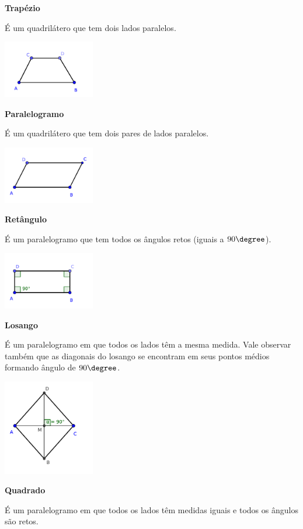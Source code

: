 \textbf{Trapézio}

É um quadrilátero que tem dois lados paralelos.

\includegraphics[width=4cm]{./cap_geometria/figs/trapezio}


\textbf{Paralelogramo}

É um quadrilátero que tem dois pares de lados paralelos.

\includegraphics[width=4cm]{./cap_geometria/figs/paralelogramo}


\textbf{Retângulo}

É um paralelogramo que tem todos os ângulos retos (iguais a $90\degree$).

\includegraphics[width=4cm]{./cap_geometria/figs/retangulo}


\textbf{Losango}

É um paralelogramo em que todos os lados têm a mesma medida. Vale observar também que as diagonais do losango se encontram em seus pontos médios formando ângulo de $90\degree$.

\includegraphics[width=4cm]{./cap_geometria/figs/losango}


\textbf{Quadrado}

É um paralelogramo em que todos os lados têm medidas iguais e todos os ângulos são retos.


